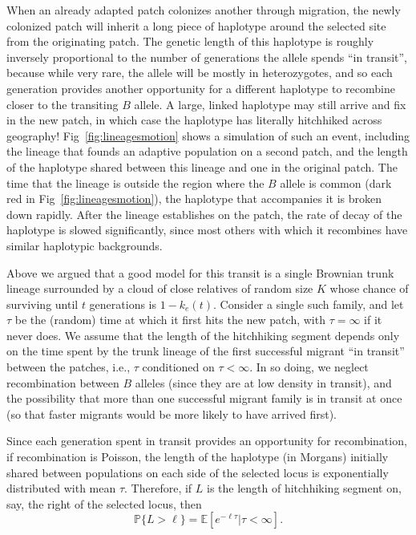 \documentclass{article}
\renewcommand{\P}{\mathbb{P}}
\newcommand{\E}{\mathbb{E}}
\begin{document}
When an already adapted patch colonizes another through migration,
 the newly colonized patch will inherit a long piece of haplotype around the selected site from the originating patch.
The genetic length of this haplotype is roughly inversely proportional to the
number of generations the allele spends ``in transit'', 
because while very rare, the allele will be mostly in heterozygotes,
and so each generation provides another opportunity for a different haplotype to recombine closer to the transiting $B$ allele.
A large, linked haplotype may still arrive and fix in the new patch,
in which case the haplotype has literally hitchhiked across geography!
Fig~\ref{fig:lineagesmotion} shows a simulation of such an event,
including the lineage that founds an adaptive population on a second patch,
and the length of the haplotype shared between this lineage and one in the original patch.
The time that the lineage is outside the region where the $B$ allele is common (dark red in Fig~\ref{fig:lineagesmotion}), 
the haplotype that accompanies it is broken down rapidly. 
After the lineage establishes on the patch, the rate of decay of the haplotype is slowed significantly, 
since most others with which it recombines have similar haplotypic backgrounds. 


Above we argued that a good model for this transit is a single Brownian trunk lineage
surrounded by a cloud of close relatives of random size $K$
whose chance of surviving until $t$ generations is $1-k_e(t)$.
Consider a single such family, and let $\tau$ be the (random) time at which it first hits the new patch,
with $\tau = \infty$ if it never does. 
We assume that the length of the hitchhiking segment depends only on 
the time spent by the trunk lineage of the first successful migrant ``in transit'' between the patches,
i.e., $\tau$ conditioned on $\tau < \infty$.
In so doing, we neglect 
recombination between $B$ alleles (since they are at low density in transit),
and the possibility that more than one successful migrant family is in transit at once
(so that faster migrants would be more likely to have arrived first).

Since each generation spent in transit provides an opportunity for recombination,
if recombination is Poisson, the length of the haplotype (in Morgans)
initially shared between populations on each side of the selected locus is exponentially distributed
with mean $\tau$. 
Therefore, if $L$ is the length of hitchhiking segment on, say, the right of
the selected locus, then
\begin{equation} \label{eqn:haplen_cdf2}
\P\{L>\ell\} = \E[e^{-\ell \tau}|\tau<\infty] .
\end{equation}
\end{document}
